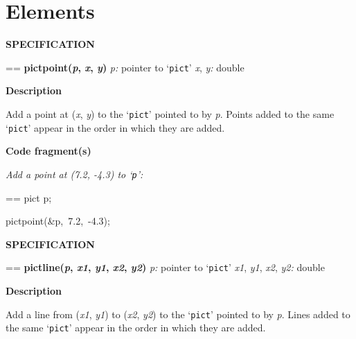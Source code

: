 \documentclass{book}
\makeatletter
\newcommand\Texinfocommandstyletextvar[1]{{\normalfont{}\textsl{#1}}}%
\newenvironment{Texinfopreformatted}{%
  \par\GNUTobeylines\obeyspaces\frenchspacing\parskip=\z@\parindent=\z@}{}
{\catcode`\^^M=13 \gdef\GNUTobeylines{\catcode`\^^M=13 \def^^M{\null\par}}}
\newenvironment{Texinfoindented}{\begin{list}{}{}\item\relax}{\end{list}}
\renewcommand{\_}{\Texinfounderscore\discretionary{}{}{}}
\makeatother
\begin{document}
\section{{Elements}}
\label{anchor:Elements}%

\noindent{}\textbf{SPECIFICATION}
\begin{Texinfoindented}
\begin{Texinfopreformatted}%
\textbf{pict\_point(\Texinfocommandstyletextvar{p}, \Texinfocommandstyletextvar{x}, \Texinfocommandstyletextvar{y})}
\Texinfocommandstyletextvar{p:} pointer to `\texttt{pict}'
\Texinfocommandstyletextvar{x}, \Texinfocommandstyletextvar{y:} double
\end{Texinfopreformatted}
\end{Texinfoindented}

\noindent{}\textbf{Description}

Add a point at (\Texinfocommandstyletextvar{x}, \Texinfocommandstyletextvar{y}) to the `\texttt{pict}' pointed to by \Texinfocommandstyletextvar{p}.
Points added to the same `\texttt{pict}' appear in the order in which they are added.

\noindent{}\textbf{Code fragment(s)}

\emph{Add a point at (7.2, -4.3) to `\texttt{p}':}
\begin{Texinfoindented}
\begin{Texinfopreformatted}%
\ttfamily pict p;

pict\_point(\&p,\ 7.2,\ -4.3);
\end{Texinfopreformatted}
\end{Texinfoindented}
%

\noindent{}\textbf{SPECIFICATION}
\begin{Texinfoindented}
\begin{Texinfopreformatted}%
\textbf{pict\_line(\Texinfocommandstyletextvar{p}, \Texinfocommandstyletextvar{x1}, \Texinfocommandstyletextvar{y1}, \Texinfocommandstyletextvar{x2}, \Texinfocommandstyletextvar{y2})}
\Texinfocommandstyletextvar{p:} pointer to `\texttt{pict}'
\Texinfocommandstyletextvar{x1}, \Texinfocommandstyletextvar{y1}, \Texinfocommandstyletextvar{x2}, \Texinfocommandstyletextvar{y2:} double
\end{Texinfopreformatted}
\end{Texinfoindented}
%

\noindent{}\textbf{Description}

Add a line from (\Texinfocommandstyletextvar{x1}, \Texinfocommandstyletextvar{y1}) to (\Texinfocommandstyletextvar{x2}, \Texinfocommandstyletextvar{y2})
to the `\texttt{pict}' pointed to by \Texinfocommandstyletextvar{p}.
Lines added to the same `\texttt{pict}' appear in the order in which they are added.
\end{document}
